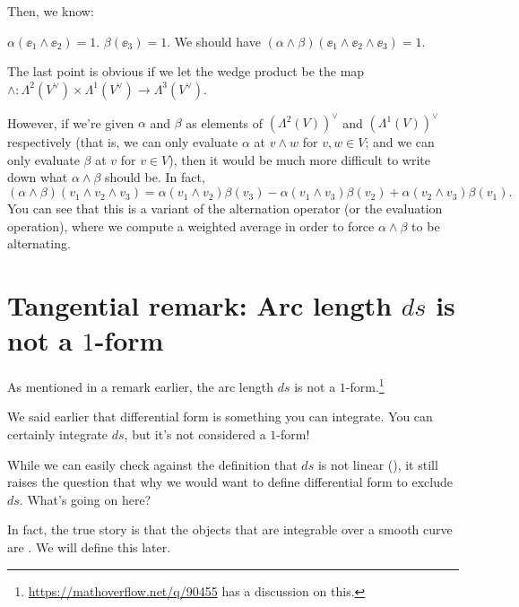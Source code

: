 Then, we know:
\begin{itemize}
	\ii $\alpha(\ee_1 \wedge \ee_2) = 1$.
	\ii $\beta(\ee_3) = 1$.
	\ii We should have $(\alpha \wedge \beta)(\ee_1 \wedge \ee_2 \wedge \ee_3) = 1$.
\end{itemize}
The last point is obvious if we let the wedge product be the map $\wedge \colon
\Lambda^2(V^\vee) \times \Lambda^1(V^\vee) \to \Lambda^3(V^\vee)$.

However, if we're given $\alpha$ and $\beta$ as elements of $(\Lambda^2(V))^\vee$ and
$(\Lambda^1(V))^\vee$ respectively (that is, we can only evaluate $\alpha$ at $v \wedge w$ for $v, w
\in V$; and we can only evaluate $\beta$ at $v$ for $v \in V$), then it would be much more difficult
to write down what $\alpha \wedge \beta$ should be. In fact,
\[
	(\alpha \wedge \beta)(v_1 \wedge v_2 \wedge v_3) =
	\alpha(v_1 \wedge v_2) \beta(v_3)
	- \alpha(v_1 \wedge v_3) \beta(v_2)
	+ \alpha(v_2 \wedge v_3) \beta(v_1).
\]
You can see that this is a variant of the alternation operator (or the evaluation operation),
where we compute a weighted average in order to force $\alpha \wedge \beta$ to be alternating.

\section{Tangential remark: Arc length $ds$ is not a $1$-form}
\label{sec:arc_length_not_one_form}
As mentioned in a remark earlier, the arc length $ds$ is not a
$1$-form.\footnote{\url{https://mathoverflow.net/q/90455} has a discussion on this.}

We said earlier that differential form is something you can integrate.
You can certainly integrate $ds$, but it's not considered a $1$-form!

While we can easily check against the definition that $ds$ is not linear
(), it still raises the question that why we would want to
define differential form to exclude $ds$.
What's going on here?

In fact, the true story is that the objects that are integrable over a smooth curve are
. We will define this later.

